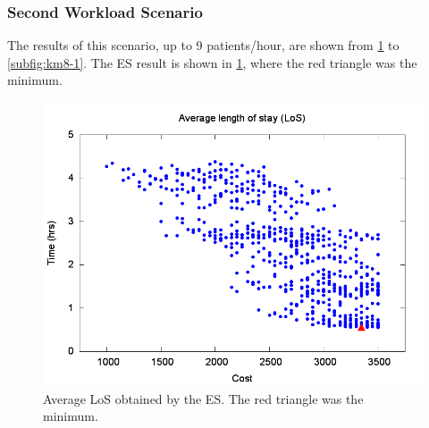 \documentclass[11pt]{article} %
\begin{document}
\clearpage

\subsubsection{Second Workload Scenario}
\label{ssub:Case-Study-2A}

The results of this scenario, up to 9 patients/hour, are shown from
\ref{subfig:es8-1} to \ref{subfig:km8-1}. The ES result is shown
in \ref{subfig:es8-1}, where the red triangle was the minimum. 
\begin{figure}[H]
\noindent \begin{centering}
\includegraphics[width=0.95\columnwidth,height=0.25\paperheight]{figs4/v0/6400-602-50-exh-LoS-min}
\par\end{centering}

\caption{Average LoS obtained by the ES. The red triangle was the minimum.
\label{subfig:es8-1}}
\end{figure}
\end{document}
